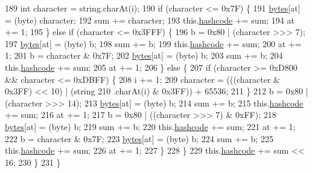 \begin{DoxyCode}
189                 \textcolor{keywordtype}{int} character = \textcolor{keywordtype}{string}.charAt(i);
190                 \textcolor{keywordflow}{if} (character <= 0x7F) \{
191                     \hyperlink{classorg_1_1json_1_1_kim_aca37e9b2f118afc91bc8d1f37512819b}{bytes}[at] = (byte) character;
192                     sum += character;
193                     this.\hyperlink{classorg_1_1json_1_1_kim_aab8a2339df2bbc09510350775572ecf2}{hashcode} += sum;
194                     at += 1;
195                 \} \textcolor{keywordflow}{else} \textcolor{keywordflow}{if} (character <= 0x3FFF) \{
196                     b = 0x80 | (character >>> 7);
197                     \hyperlink{classorg_1_1json_1_1_kim_aca37e9b2f118afc91bc8d1f37512819b}{bytes}[at] = (byte) b;
198                     sum += b;
199                     this.\hyperlink{classorg_1_1json_1_1_kim_aab8a2339df2bbc09510350775572ecf2}{hashcode} += sum;
200                     at += 1;
201                     b = character & 0x7F;
202                     \hyperlink{classorg_1_1json_1_1_kim_aca37e9b2f118afc91bc8d1f37512819b}{bytes}[at] = (byte) b;
203                     sum += b;
204                     this.\hyperlink{classorg_1_1json_1_1_kim_aab8a2339df2bbc09510350775572ecf2}{hashcode} += sum;
205                     at += 1;
206                 \} \textcolor{keywordflow}{else} \{
207                     \textcolor{keywordflow}{if} (character >= 0xD800 && character <= 0xDBFF) \{
208                         i += 1;
209                         character = (((character & 0x3FF) << 10) | (\textcolor{keywordtype}{string}
210                                 .charAt(i) & 0x3FF)) + 65536;
211                     \}
212                     b = 0x80 | (character >>> 14);
213                     \hyperlink{classorg_1_1json_1_1_kim_aca37e9b2f118afc91bc8d1f37512819b}{bytes}[at] = (byte) b;
214                     sum += b;
215                     this.\hyperlink{classorg_1_1json_1_1_kim_aab8a2339df2bbc09510350775572ecf2}{hashcode} += sum;
216                     at += 1;
217                     b = 0x80 | ((character >>> 7) & 0xFF);
218                     \hyperlink{classorg_1_1json_1_1_kim_aca37e9b2f118afc91bc8d1f37512819b}{bytes}[at] = (byte) b;
219                     sum += b;
220                     this.\hyperlink{classorg_1_1json_1_1_kim_aab8a2339df2bbc09510350775572ecf2}{hashcode} += sum;
221                     at += 1;
222                     b = character & 0x7F;
223                     \hyperlink{classorg_1_1json_1_1_kim_aca37e9b2f118afc91bc8d1f37512819b}{bytes}[at] = (byte) b;
224                     sum += b;
225                     this.\hyperlink{classorg_1_1json_1_1_kim_aab8a2339df2bbc09510350775572ecf2}{hashcode} += sum;
226                     at += 1;
227                 \}
228             \}
229             this.\hyperlink{classorg_1_1json_1_1_kim_aab8a2339df2bbc09510350775572ecf2}{hashcode} += sum << 16;
230         \}
231     \}
\end{DoxyCode}


